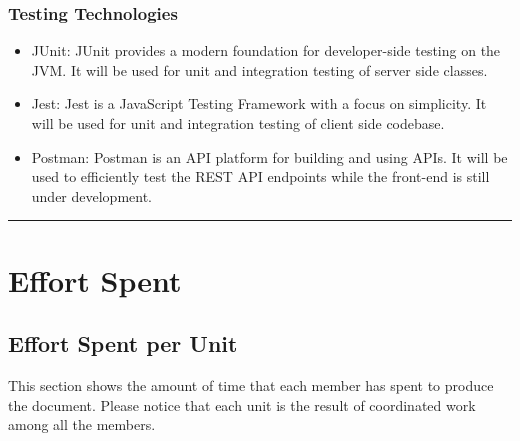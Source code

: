 \documentclass{Configuration_Files/Template}
\begin{document}
\subsection{Testing Technologies}
\begin{itemize}
    \item \textcolor{bluepoli}{JUnit}: JUnit provides a modern foundation for developer-side testing on the JVM. It will be used for unit and integration testing of server side classes.
    \item \textcolor{bluepoli}{Jest}: Jest is a JavaScript Testing Framework with a focus on simplicity. It will be used for unit and integration testing of client side codebase.
    \item \textcolor{bluepoli}{Postman}: Postman is an API platform for building and using APIs. It will be used to efficiently test the REST API endpoints while the front-end is still under development.
\end{itemize}

{\color{bluepoli}\rule{\linewidth}{0.1pt}}

\chapter{Effort Spent}

\section{Effort Spent per Unit}

This section shows the amount of time that each member has spent to produce the document. Please notice that each unit is the result of coordinated work among all the members.
\end{document}
